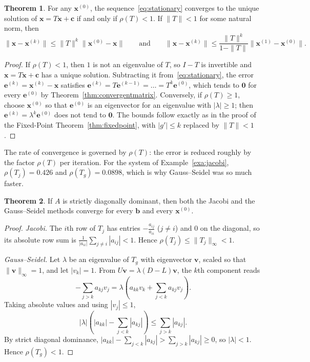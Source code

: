 \documentclass[11pt,a4paper]{article}
\numberwithin{equation}{section}
\theoremstyle{definition}
\newtheorem{thm}{Theorem}[subsection]
\begin{document}
\begin{thm}
\label{thm:iterconv}
For any $\mathbf x^{(0)}$, the sequence~\eqref{eq:stationary} converges to the unique solution of $\mathbf x = T\mathbf x+\mathbf c$ if and only if
$\rho(T)<1$. If $\|T\|<1$ for some natural norm, then
$$\|\mathbf x-\mathbf x^{(k)}\|\leq\|T\|^k\|\mathbf x^{(0)}-\mathbf x\|\qquad\text{and}\qquad \|\mathbf x-\mathbf x^{(k)}\|\leq\frac{\|T\|^k}{1-\|T\|}\|\mathbf x^{(1)}-\mathbf x^{(0)}\| .$$
\end{thm}

\begin{proof}
If $\rho(T)<1$, then $1$ is not an eigenvalue of $T$, so $I-T$ is invertible and $\mathbf x = T\mathbf x+\mathbf c$ has a unique solution.
Subtracting it from~\eqref{eq:stationary}, the error $\mathbf e^{(k)} = \mathbf x^{(k)}-\mathbf x$ satisfies $\mathbf e^{(k)} = T\mathbf e^{(k-1)} = \dots = T^k\mathbf e^{(0)}$,
which tends to $\mathbf 0$ for every $\mathbf e^{(0)}$ by Theorem~\ref{thm:convergentmatrix}. Conversely, if $\rho(T)\geq1$, choose $\mathbf x^{(0)}$
so that $\mathbf e^{(0)}$ is an eigenvector for an eigenvalue with $|\lambda|\geq1$; then $\mathbf e^{(k)} = \lambda^k\mathbf e^{(0)}$ does not tend to
$\mathbf 0$. The bounds follow exactly as in the proof of the Fixed-Point Theorem~\ref{thm:fixedpoint}, with $|g'|\leq k$ replaced by
$\|T\|<1$.
\end{proof}

The rate of convergence is governed by $\rho(T)$: the error is reduced roughly by the factor $\rho(T)$ per iteration. For the system of
Example~\ref{exa:jacobi}, $\rho(T_j) = 0.426$ and $\rho(T_g) = 0.0898$, which is why Gauss--Seidel was so much faster.

\begin{thm}
\label{thm:ddconv}
If $A$ is strictly diagonally dominant, then both the Jacobi and the Gauss--Seidel methods converge for every $\mathbf b$ and every
$\mathbf x^{(0)}$.
\end{thm}

\begin{proof}
\emph{Jacobi.} The $i$th row of $T_j$ has entries $-\frac{a_{ij}}{a_{ii}}$ ($j\neq i$) and $0$ on the diagonal, so its absolute row sum is
$\frac{1}{|a_{ii}|}\sum_{j\neq i}|a_{ij}|<1$. Hence $\rho(T_j)\leq\|T_j\|_\infty<1$.

\emph{Gauss--Seidel.} Let $\lambda$ be an eigenvalue of $T_g$ with eigenvector $\mathbf v$, scaled so that $\|\mathbf v\|_\infty = 1$, and let
$|v_k| = 1$. From $U\mathbf v = \lambda(D-L)\mathbf v$, the $k$th component reads
$$-\sum_{j>k}a_{kj}v_j = \lambda\left(a_{kk}v_k+\sum_{j<k}a_{kj}v_j\right).$$
Taking absolute values and using $|v_j|\leq1$,
$$|\lambda|\left(|a_{kk}|-\sum_{j<k}|a_{kj}|\right)\leq\sum_{j>k}|a_{kj}| .$$
By strict diagonal dominance, $|a_{kk}|-\sum_{j<k}|a_{kj}|>\sum_{j>k}|a_{kj}|\geq0$, so $|\lambda|<1$. Hence $\rho(T_g)<1$.
\end{proof}
\end{document}
